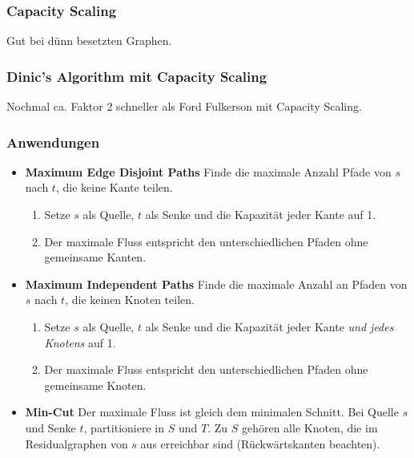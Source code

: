 \subsubsection{Capacity Scaling}
Gut bei dünn besetzten Graphen.


% 

\subsubsection{Dinic's Algorithm mit Capacity Scaling}
Nochmal ca. Faktor 2 schneller als Ford Fulkerson mit Capacity Scaling.


\subsubsection{Anwendungen}
\begin{itemize}[nosep]
	\item \textbf{Maximum Edge Disjoint Paths}\newline
	Finde die maximale Anzahl Pfade von $s$ nach $t$, die keine Kante teilen.
	\begin{enumerate}[nosep]
		\item Setze $s$ als Quelle, $t$ als Senke und die Kapazität jeder Kante auf 1.
		\item Der maximale Fluss entspricht den unterschiedlichen Pfaden ohne gemeinsame Kanten.
	\end{enumerate}
	\item \textbf{Maximum Independent Paths}\newline
	Finde die maximale Anzahl an Pfaden von $s$ nach $t$, die keinen Knoten teilen.
	\begin{enumerate}[nosep]
		\item Setze $s$ als Quelle, $t$ als Senke und die Kapazität jeder Kante \emph{und jedes Knotens} auf 1.
		\item Der maximale Fluss entspricht den unterschiedlichen Pfaden ohne gemeinsame Knoten.
	\end{enumerate}
	\item \textbf{Min-Cut}\newline
	Der maximale Fluss ist gleich dem minimalen Schnitt.
	Bei Quelle $s$ und Senke $t$, partitioniere in $S$ und $T$.
	Zu $S$ gehören alle Knoten, die im Residualgraphen von $s$ aus erreichbar sind (Rückwärtskanten beachten).
\end{itemize}

